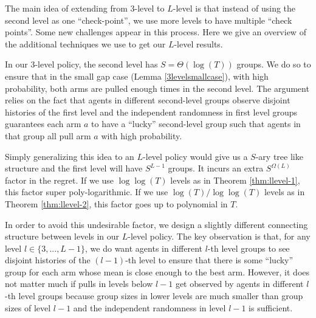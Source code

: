 The main idea of extending from 3-level to $L$-level is that instead of using the second level as one ``check-point'', we use more levels to have multiple ``check points''.  Some new challenges appear in this process. Here we give an overview of the additional techniques we use to get our $L$-level results. 

 In our 3-level policy, the second level has $S = \Theta(\log(T))$ groups. We do so to ensure that in the small gap case (Lemma \ref{3levelsmallcase}), with high probability, both arms are pulled enough times in the second level. The argument relies on the fact that agents in different second-level groups observe disjoint histories of the first level and the independent randomness in first level groups guarantees each arm $a$ to have a ``lucky'' second-level group such that agents in that group all pull arm $a$ with high probability. 

Simply generalizing this idea to an $L$-level policy would give us a $S$-ary tree like structure and the first level will have $S^{L-1}$ groups. It incurs an extra $S^{\Omega(L)}$ factor in the regret. If we use $\log\log(T)$ levels as in Theorem \ref{thm:llevel-1}, this factor super poly-logarithmic. If we use $\log(T)/\log\log(T)$ levels as in Theorem \ref{thm:llevel-2}, this factor goes up to polynomial in $T$. 

In order to avoid this undesirable factor, we design a slightly different connecting structure between levels in our $L$-level policy. The key observation is that, for any level $l \in \{3,...,L-1\}$, we do want agents in different $l$-th level groups to see disjoint histories of the $(l-1)$-th level to ensure that there is some ``lucky'' group for each arm whose mean is close enough to the best arm. However, it does not matter much if pulls in levels below $l-1$ get observed by agents in different $l$-th level groups because group sizes in lower levels are much smaller than group sizes of level $l-1$ and the independent randomness in level $l-1$ is sufficient.

